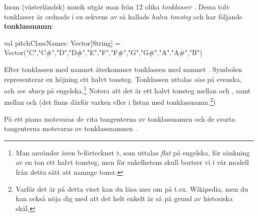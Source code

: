 Inom (västerländsk) musik utgår man från 12 olika \emph{tonklasser} .
Dessa tolv tonklasser är ordnade i en sekvens av så kallade \emph{halva tonsteg} och har följande \textbf{tonklassnamn}:
\begin{Code}
  val pitchClassNames: Vector[String] =
    Vector("C","C#","D","D#","E","F","F#","G","G#","A","A#","B")
\end{Code}
Efter tonklassen med namnet  återkommer tonklassen med namnet .
Symbolen \code{#} representerar en höjning ett halvt tonsteg. Tonklassen  uttalas \emph{siss} på svenska, och \emph{see sharp} på engelska.\footnote{Man använder även b-förtecknet $\flat$, som uttalas \emph{flat} på engelska, för sänkning av en ton ett halvt tonsteg, men för enkelhetens skull bortser vi i vår modell från detta sätt att namnge toner.}
 Notera att det är ett halvt tonsteg mellan  och , samt mellan  och  (det finns därför varken  eller  i listan med tonklassnamn.\footnote{Varför det är på detta viset kan du läsa mer om på t.ex. Wikipedia, men du kan också nöja dig med att det helt enkelt är så på grund av historiska skäl.})

På ett piano motsvaras de vita tangenterna av tonklassnamen  och de svarta tangenterna motsvaras av tonklassnamnen .

